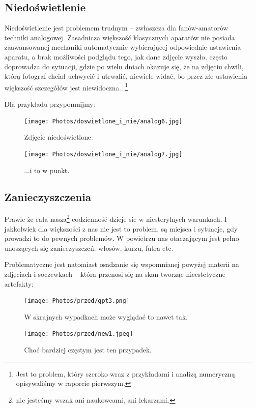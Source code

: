 \documentclass[]{mwart}
\begin{document}
\subsection{Niedoświetlenie} %
Niedoświetlenie jest problemem trudnym -- zwłaszcza dla fanów-amatorów techniki analogowej.
Zasadnicza większość klasycznych aparatów nie posiada zaawansowanej mechaniki automatycznie wybierającej
odpowiednie ustawienia aparatu, a brak możliwości podglądu tego, jak dane zdjęcie wyszło, często doprowadza
do sytuacji, gdzie po wielu dniach okazuje się, że na zdjęciu chwili, którą fotograf chciał uchwycić i utrwalić,
niewiele widać, bo przez złe ustawienia większość szczegółów jest niewidoczna...\footnote{Jest to problem, który szeroko
    wraz z przykładami i analizą numeryczną opisywaliśmy w raporcie pierwszym.}

Dla przykładu przypomnijmy:
\newpage
\begin{figure}[H]
    \centering
    \texttt{[image: Photos/doswietlone\_i\_nie/analog6.jpg]}
    \caption{Zdjęcie niedoświetlone.}
\end{figure}
\begin{figure}[H]
    \centering
    \texttt{[image: Photos/doswietlone\_i\_nie/analog7.jpg]}
    \caption{...i to w punkt.}
\end{figure}

\newpage
\subsection{Zanieczyszczenia}
Prawie że cała nasza\footnote{nie jesteśmy wszak ani naukowcami, ani lekarzami.} codzienność
dzieje sie w niesterylnych warunkach. I jakkolwiek dla większości z nas nie jest to problem, są miejsca i sytuacje,
gdy prowadzi to do pewnych problemów. W powietrzu nas otaczającym jest pełno unoszących się zanieczyszczeń: włosów, kurzu, futra etc.

Problematyczne jest natomiast osadzanie się wspomnianej powyżej materii na zdjęciach i soczewkach -- która przenosi się na
skan tworząc nieestetyczne artefakty:

\begin{figure}[H]
    \centering
    \texttt{[image: Photos/przed/gpt3.png]}
    \caption{W skrajnych wypadkach może wyglądać to nawet tak.}
\end{figure}

\begin{figure}[H]
    \centering
    \texttt{[image: Photos/przed/new1.jpeg]}
    \caption{Choć bardziej częstym jest ten przypadek.}
\end{figure}
\end{document}

